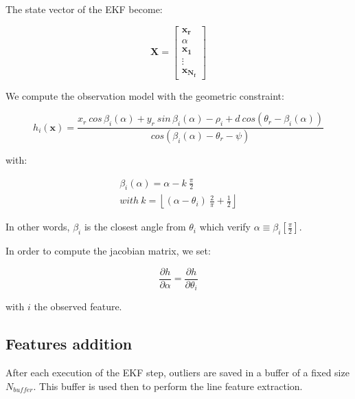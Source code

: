 \documentclass[a4paper,12pt]{article}
\begin{document}
The state vector of the EKF become:

\begin{equation}
\mathbf{X} = 
\left [
\begin{array}{c}
\mathbf{x_r}\\ 
\alpha\\ 
\mathbf{x_1}\\
\vdots \\  
\mathbf{x_{N_f}}
\end{array}
\right ]
\end{equation}

We compute the observation model with the geometric constraint:

\begin{equation}
h_i(\mathbf{x}) =\frac{ x_r \: cos \, \beta_i(\alpha) + y_r \: sin \, \beta_i(\alpha) - \rho_i + d\: cos(\theta_r-\beta_i(\alpha))}{cos(\beta_i(\alpha)-\theta_r-\psi)} 
\end{equation}

with:

\begin{equation}
\begin{array}{l}
\beta_i(\alpha) = \alpha - k \: \frac{\pi}{2}\\
\mathit{with } \: k = \left \lfloor (\alpha-\theta_i) \: \frac{2 }{\pi} +\frac{1}{2} \right \rfloor
\end{array}
\end{equation}

In other words, $\beta_i$ is the closest angle from $\theta_i$ which verify $\alpha \equiv \beta_i \left [ \frac{\pi}{2} \right ]$.

In order to compute the jacobian matrix, we set:

\begin{equation}
\frac{\partial h}{\partial \alpha} = \frac{\partial h}{\partial \theta_i}
\end{equation}

with $i$ the observed feature.

\subsection{Features addition}
\label{sec:features}

After each execution of the EKF step, outliers are saved in a buffer of a fixed size $N_{buffer}$.
This buffer is used then to perform the line feature extraction.

\end{document}
